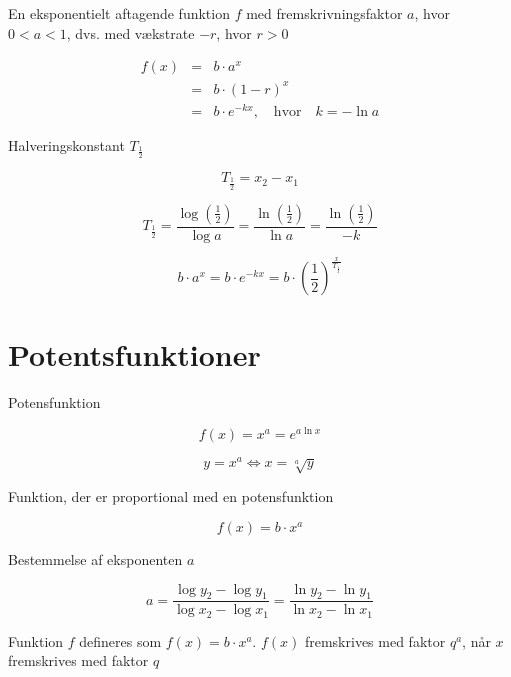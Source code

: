 \documentclass[11pt,a4paper,landscape,twocolumn,fleqn,leqno]{article}
\begin{document}
En eksponentielt aftagende funktion $f$ med fremskrivningsfaktor $a$, hvor $0 < a < 1$, dvs. med vækstrate $-r$, hvor $r > 0$

\begin{eqnarray}
f(x) & = & b \cdot a^x \\
 & = & b \cdot (1-r)^x \nonumber \\
 & = & b \cdot e^{-kx}, \quad \text{hvor} \quad k = -\ln a \nonumber
\end{eqnarray}

Halveringskonstant $T_{\frac{1}{2}}$

\begin{equation}
T_{\frac{1}{2}} = x_2 - x_1
\end{equation}

\begin{equation}
T_{\frac{1}{2}} = \frac{\log\left(\frac{1}{2}\right)}{\log a} = \frac{\ln\left(\frac{1}{2}\right)}{\ln a} = \frac{\ln\left(\frac{1}{2}\right)}{-k}
\end{equation}

\begin{equation}
b \cdot a^x = b \cdot e^{-kx} = b \cdot \left(\frac{1}{2}\right)^{\frac{x}{T_{\frac{1}{2}}}}
\end{equation}

\section{Potentsfunktioner}

Potensfunktion

\begin{equation}
f(x) = x^a = e^{a\ln x}
\end{equation}

\begin{equation}
y = x^a \Leftrightarrow x = \sqrt[a]{y}
\end{equation}

Funktion, der er proportional med en potensfunktion

\begin{equation}
f(x) = b \cdot x^a
\end{equation}

Bestemmelse af eksponenten $a$

\begin{equation}
a = \frac{\log y_2 - \log y_1}{\log x_2 - \log x_1} = \frac{\ln y_2 - \ln y_1}{\ln x_2 - \ln x_1}
\end{equation}

Funktion $f$ defineres som $f(x) = b \cdot x^a$. $f(x)$ fremskrives med faktor $q^a$, når $x$ fremskrives med faktor $q$
\end{document}
